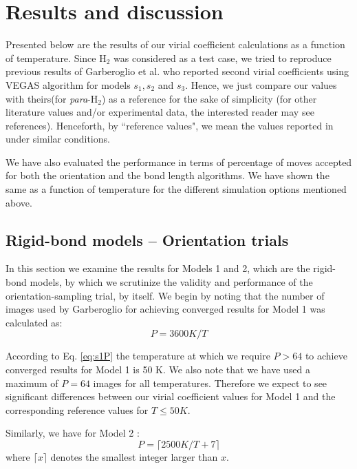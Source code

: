     \section{Results and discussion}
        Presented below are the results of our virial coefficient calculations as a function of temperature. Since H$_2$ was considered as a test case, we tried to reproduce previous results of Garberoglio et al.\cite{Garberoglio2014} who reported second virial coefficients using VEGAS\cite{Lepage1972} algorithm for models $s_1, s_2$ and $s_3$. Hence, we just compare our values with theirs(for \emph{para}-H$_2$) as a reference for the sake of simplicity (for other literature values and/or experimental data, the interested reader may see references\cite{Goodwin1963, Patkowski2008, Leachman2009, Sakoda2012, Garberoglio2012, Garberoglio2014}). Henceforth, by ``reference values", we mean the values reported in \cite{Garberoglio2014} under similar conditions.

        We have also evaluated the performance in terms of percentage of moves accepted for both the orientation and the bond length algorithms. We have shown the same as a function of temperature for the different simulation options mentioned above.

        \subsection{Rigid-bond models -- Orientation trials}
            In this section we examine the results for Models 1 and 2, which are the rigid-bond models, by which we scrutinize the validity and performance of the orientation-sampling trial, by itself. We begin by noting that the number of images used by Garberoglio for achieving converged results \cite{Patkowski2008} for Model 1 was calculated as:
            \begin{equation}
            \label{eq:s1P}
                P = 3600 K/T
            \end{equation}
            
            According to Eq. \eqref{eq:s1P} the temperature at which we require $P > 64$ to achieve converged results for Model 1 is 50 K. We also note that we have used a maximum of $P = 64$ images for all temperatures. Therefore we expect to see significant differences between our virial coefficient values for Model 1 and the corresponding reference values for $T \le 50 K$.
            
            Similarly, we have for Model 2 \cite{Garberoglio2012}:
            \begin{equation}
            \label{eq:s2P}
                P = \lceil 2500 K/T + 7 \rceil
            \end{equation}
            where $\lceil x \rceil$ denotes the smallest integer larger than $x$.
            
